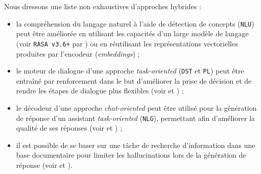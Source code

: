 		\begin{leftBarExamples}
			Nous dressons une liste non exhaustives d'approches hybrides :
			\begin{itemize}
				\item la compréhension du langage naturel à l'aide de détection de concepts (\texttt{NLU}) peut être améliorée en utilisant les capacités d'un large modèle de langage (voir \texttt{RASA v3.6+} par \cite{bocklisch-etal:2017:rasa-open-source}) ou en réutilisant les représentations vectorielles produites par l'encodeur (\textit{embeddings}) ;
				\item le moteur de dialogue d'une approche \textit{task-oriented} (\texttt{DST} et \texttt{PL}) peut être entraîné par renforcement dans le but d'améliorer la prise de décision et de rendre les étapes de dialogue plus flexibles (voir \cite{chen-etal:2017:survey-dialogue-systems} et \cite{brabra-etal:2022:dialogue-management-conversational}) ;
				\item le décodeur d'une approche \textit{chat-oriented} peut être utilisé pour la génération de réponse d'un assistant \textit{task-oriented} (\texttt{NLG}), permettant afin d'améliorer la qualité de ses réponses (voir \cite{gao-etal:2018:neural-approaches-conversational} et \cite{chen-etal:2017:survey-dialogue-systems}) ;
				\item il est possible de se baser sur une tâche de recherche d'information dans une base documentaire pour limiter les hallucinations lors de la génération de réponse (voir \cite{shuster-etal:2021:retrieval-augmentation-reduces} et \cite{zhang-etal:2016:neural-information-retrieval}).
			\end{itemize}
		\end{leftBarExamples}